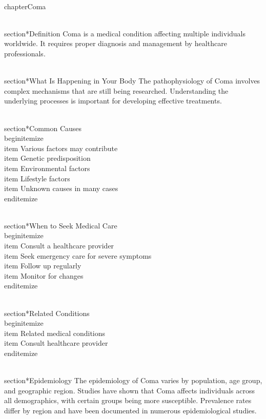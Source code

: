 
\\chapter{Coma}

\\section*{Definition}
Coma is a medical condition affecting multiple individuals worldwide. It requires proper diagnosis and management by healthcare professionals.

\\section*{What Is Happening in Your Body}
The pathophysiology of Coma involves complex mechanisms that are still being researched. Understanding the underlying processes is important for developing effective treatments.

\\section*{Common Causes}
\\begin{itemize}
\\item Various factors may contribute\n  \\item Genetic predisposition\n  \\item Environmental factors\n  \\item Lifestyle factors\n  \\item Unknown causes in many cases
\\end{itemize}

\\section*{When to Seek Medical Care}
\\begin{itemize}
\\item Consult a healthcare provider\n  \\item Seek emergency care for severe symptoms\n  \\item Follow up regularly\n  \\item Monitor for changes
\\end{itemize}

\\section*{Related Conditions}
\\begin{itemize}
\\item Related medical conditions\n  \\item Consult healthcare provider
\\end{itemize}

\\section*{Epidemiology}
The epidemiology of Coma varies by population, age group, and geographic region. Studies have shown that Coma affects individuals across all demographics, with certain groups being more susceptible. Prevalence rates differ by region and have been documented in numerous epidemiological studies.

